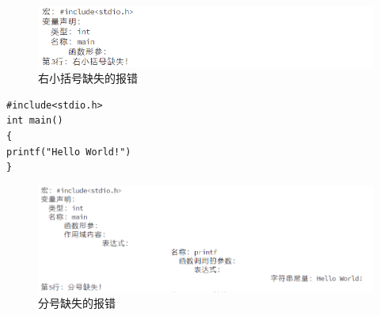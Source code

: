 \documentclass[supercite]{Experimental_Report}
\theoremstyle{definition}
\begin{document}
\begin{figure}[htb]
	\begin{center}
		\includegraphics[scale=1]{images/报错4.png}
		\caption{右小括号缺失的报错}
		\label{fig2-4}
	\end{center}
\end{figure}

\begin{lstlisting}[title=语法错误：分号缺失,frame=none]
#include<stdio.h>
int main()
{
printf("Hello World!")
}
\end{lstlisting}

\begin{figure}[htb]
	\begin{center}
		\includegraphics[scale=1]{images/报错5.png}
		\caption{分号缺失的报错}
		\label{fig2-5}
	\end{center}
\end{figure}
	
\end{document}
